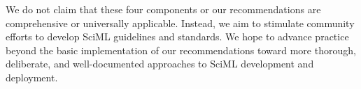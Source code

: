 We do not claim that these four components or our recommendations are comprehensive or universally applicable. Instead, we aim to stimulate community efforts to develop SciML guidelines and standards. We hope to advance practice beyond the basic implementation of our recommendations toward more thorough, deliberate, and well-documented approaches to SciML development and deployment.
